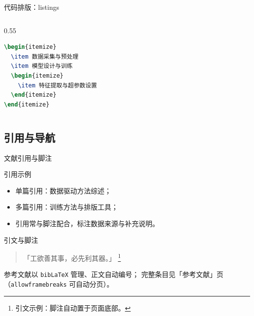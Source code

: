 \begin{frame}[fragile]{代码排版：listings}
  \begin{columns}[T]
    \begin{column}{0.55\textwidth}
\begin{lstlisting}[language=TeX]
\begin{itemize}
  \item 数据采集与预处理
  \item 模型设计与训练
  \begin{itemize}
    \item 特征提取与超参数设置
  \end{itemize}
\end{itemize}
\end{lstlisting}
    \end{column}
  \end{columns}
\end{frame}

\subsection{引用与导航}

\begin{frame}{文献引用与脚注}
  \begin{block}{引用示例}
    \begin{itemize}
      \item 单篇引用：数据驱动方法综述\cite{zhang2023}；
      \item 多篇引用：训练方法与排版工具\cite{chen2022,li2020}；
      \item 引用常与脚注配合，标注数据来源与补充说明\cite{wang2021,gao2024}。
    \end{itemize}
  \end{block}
  \begin{exampleblock}{引文与脚注}
    \begin{quote}\small
      「工欲善其事，必先利其器。」%
      \footnote{引文示例：脚注自动置于页面底部。}
    \end{quote}
  \end{exampleblock}
  {\small 参考文献以 \texttt{bib\LaTeX} 管理、正文自动编号；
    完整条目见「参考文献」页（\texttt{allowframebreaks} 可自动分页）。}
\end{frame}


